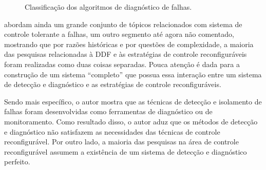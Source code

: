 \begin{figure}[htb]
\centering
    \qquad
    \caption{Classificação dos algoritmos de diagnóstico de falhas.}
    \label{fig:arvore_venkatasu}
\end{figure}

 abordam ainda um grande conjunto de tópicos relacionados
com sistema de controle tolerante a falhas, um outro segmento até agora não
comentado, mostrando que por razões históricas e por questões de complexidade, a
maioria das pesquisas relacionadas à DDF e às estratégias de controle
reconfiguráveis foram realizadas como duas coisas separadas. Pouca atenção é
dada para a construção de um sistema ``completo'' que possua essa interação
entre um sistema de detecção e diagnóstico e as estratégias de controle
reconfiguráveis.

Sendo mais específico, o autor mostra que as técnicas de detecção e isolamento
de falhas foram desenvolvidas como ferramentas de diagnóstico ou de
monitoramento. Como resultado disso, o autor aduz que os métodos de detecção e
diagnóstico não satisfazem as necessidades das técnicas de controle
reconfigurável. Por outro lado, a maioria das pesquisas na área de controle
reconfigurável assumem a existência de um sistema de detecção e diagnóstico
perfeito.

